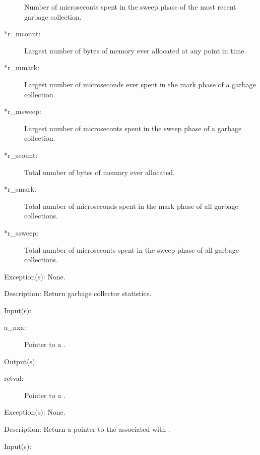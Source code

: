 \begin{capi}
\begin{capilist}
\begin{description}
			Number of microseconts spent in the sweep phase of the
			most recent garbage collection.
		\item[*r\_mcount: ]
			Largest number of bytes of memory ever allocated at any
			point in time.
		\item[*r\_mmark: ]
			Largest number of microseconds ever spent in the mark
			phase of a garbage collection.
		\item[*r\_msweep: ]
			Largest number of microseconts spent in the sweep phase
			of a garbage collection.
		\item[*r\_scount: ]
			Total number of bytes of memory ever allocated.
		\item[*r\_smark: ]
			Total number of microseconds spent in the mark phase of
			all garbage collections.
		\item[*r\_ssweep: ]
			Total number of microseconts spent in the sweep phase of
			all garbage collections.
		\end{description}
	\item[Exception(s): ] None.
	\item[Description: ]
		Return garbage collector statistics.
	\end{capilist}
\label{nxa_nx_get}
	\begin{capilist}
	\item[Input(s): ]
		\begin{description}\item[]
		\item[a\_nxa: ]
			Pointer to a .
		\end{description}
	\item[Output(s): ]
		\begin{description}\item[]
		\item[retval: ]
			Pointer to a .
		\end{description}
	\item[Exception(s): ] None.
	\item[Description: ]
		Return a pointer to the  associated with
		.
	\end{capilist}
\label{nxa_gcdict_get}
	\begin{capilist}
	\item[Input(s): ]
		\begin{description}\item[]

\end{description}
\end{capilist}
\end{capi}
